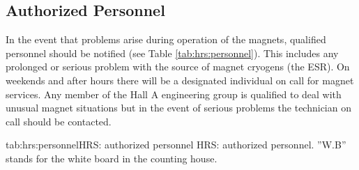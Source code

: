
\begin{safetyen}{10}{15}
\subsection{Authorized Personnel}
\end{safetyen}

In the event that problems arise during 
operation of the magnets, qualified personnel should be notified
(see Table \ref{tab:hrs:personnel}).  
This includes any prolonged or serious problem with the source of magnet 
cryogens (the ESR).  On weekends and after hours there will be a 
designated individual on call for magnet services.  Any member of the 
Hall A engineering group is qualified to deal with unusual magnet 
situations but in the event of serious problems the technician on
call should be contacted.

\begin{namestab}{tab:hrs:personnel}{HRS: authorized personnel}{%
      HRS: authorized personnel. ''W.B'' stands for the white board 
      in the counting house.}
   \EdFolts{}
   \ScotSpiegel{}
   \MarkStevens{}
   \GaryDezern{}
   \ToddEwing{}
   \HeidiFansler{}
\end{namestab}


